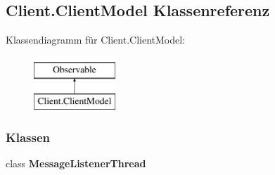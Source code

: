 \hypertarget{a00013}{\subsection{Client.\-Client\-Model Klassenreferenz}
\label{a00013}
}
Klassendiagramm für Client.\-Client\-Model\-:\begin{figure}[H]
\begin{center}
\leavevmode
\includegraphics[height=2.000000cm]{a00013}
\end{center}
\end{figure}
\subsubsection*{Klassen}
\begin{DoxyCompactItemize}
\item 
class {\bfseries Message\-Listener\-Thread}
\end{DoxyCompactItemize}
